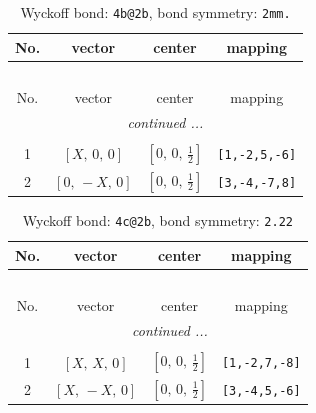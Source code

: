 \documentclass[fleqn,8pt]{jsarticle}
\begin{document}
\renewcommand{\arraystretch}{1.2}
\begin{longtable}{cccc}
\caption{Wyckoff bond: {\tt 4b@2b}, bond symmetry: {\tt 2mm.}}
 \\
 \hline \hline
No. & vector & center & mapping \\ \hline \endfirsthead

\multicolumn{3}{l}{\tablename\ \thetable{}} \\
 \hline \hline
No. & vector & center & mapping \\ \hline \endhead

 \hline \hline
\multicolumn{3}{r}{\footnotesize\it continued ...} \\ \endfoot

 \hline \hline
\multicolumn{3}{r}{} \\ \endlastfoot

1 & $\left[ X,\, 0,\, 0 \right]$ & $\left[ 0,\, 0,\, \frac{1}{2} \right]$ & {\tt [1,-2,5,-6]} \\ \hline
2 & $\left[ 0,\, - X,\, 0 \right]$ & $\left[ 0,\, 0,\, \frac{1}{2} \right]$ & {\tt [3,-4,-7,8]} \\
\end{longtable}
\renewcommand{\arraystretch}{1.2}
\begin{longtable}{cccc}
\caption{Wyckoff bond: {\tt 4c@2b}, bond symmetry: {\tt 2.22}}
 \\
 \hline \hline
No. & vector & center & mapping \\ \hline \endfirsthead

\multicolumn{3}{l}{\tablename\ \thetable{}} \\
 \hline \hline
No. & vector & center & mapping \\ \hline \endhead

 \hline \hline
\multicolumn{3}{r}{\footnotesize\it continued ...} \\ \endfoot

 \hline \hline
\multicolumn{3}{r}{} \\ \endlastfoot

1 & $\left[ X,\, X,\, 0 \right]$ & $\left[ 0,\, 0,\, \frac{1}{2} \right]$ & {\tt [1,-2,7,-8]} \\ \hline
2 & $\left[ X,\, - X,\, 0 \right]$ & $\left[ 0,\, 0,\, \frac{1}{2} \right]$ & {\tt [3,-4,5,-6]} \\
\end{longtable}
\renewcommand{\arraystretch}{1.2}
\end{document}
